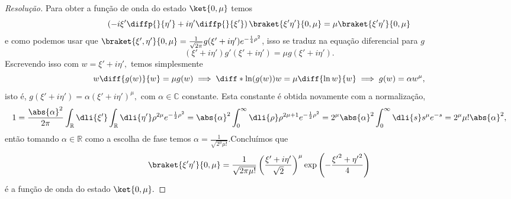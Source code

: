 \begin{proof}[Resolução]
   Para obter a função de onda do estado \(\ket{0,\mu}\) temos
   \begin{equation*}
      \left(-i\xi' \diffp{}{\eta'} + i\eta' \diffp{}{\xi'}\right)\braket{\xi'\eta'}{0,\mu} = \mu \braket{\xi' \eta'}{0,\mu}
   \end{equation*}
   e como podemos usar que \(\braket{\xi',\eta'}{0,\mu} = \frac1{\sqrt{2\pi}}g(\xi' + i \eta') e^{-\frac14 \rho^2}\), isso se traduz na equação diferencial para \(g\)
   \begin{equation*}
      (\xi' + i \eta') g'(\xi' + i \eta') = \mu g(\xi' + i \eta').
   \end{equation*}
   Escrevendo isso com \(w = \xi' + i \eta',\) temos simplesmente
   \begin{equation*}
      w \diff{g(w)}{w} = \mu g(w) \implies \diff*{\ln(g(w))}{w} = \mu \diff{\ln{w}}{w} \implies g(w) = \alpha w^\mu,
   \end{equation*}
   isto é, \(g(\xi' + i \eta') = \alpha (\xi' + i \eta')^\mu,\) com \(\alpha \in \mathbb{C}\) constante. Esta constante é obtida novamente com a normalização,
   \begin{equation*}
      1 = \frac{\abs{\alpha}^2}{2\pi}\int_{\mathbb{R}} \dli{\xi'} \int_{\mathbb{R}} \dli{\eta'} \rho^{2\mu} e^{-\frac12 \rho^2} = \abs{\alpha}^2 \int_0^\infty \dli{\rho} \rho^{2\mu+ 1} e^{-\frac12\rho^2} = 2^\mu\abs{\alpha}^2 \int_0^{\infty}\dli{s} s^{\mu} e^{-s} = 2^\mu \mu! \abs{\alpha}^2,
   \end{equation*}
   então tomando \(\alpha \in \mathbb{R}\) como a escolha de fase temos \(\alpha = \frac{1}{\sqrt{2^\mu \mu!}}.\)Concluímos que
   \begin{equation*}
      \braket{\xi'\eta'}{0,\mu} = \frac{1}{\sqrt{2\pi \mu!}} \left(\frac{\xi' + i \eta'}{\sqrt{2}}\right)^\mu \exp\left(-\frac{{\xi'}^2 + {\eta'}^2}{4}\right)
   \end{equation*}
   é a função de onda do estado \(\ket{0,\mu}.\)
\end{proof}


